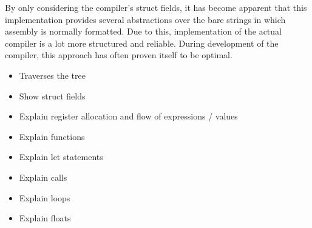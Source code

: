 By only considering the compiler's struct fields, it has become apparent that this implementation provides several abstractions over the bare strings in which assembly is normally formatted.
Due to this, implementation of the actual compiler is a lot more structured and reliable.
During development of the compiler, this approach has often proven itself to be optimal.

\begin{itemize}
	\item Traverses the tree
	\item Show struct fields
	\item Explain register allocation and flow of expressions / values
	\item Explain functions
	\item Explain let statements
	\item Explain calls
	\item Explain loops
	\item Explain floats
\end{itemize}
